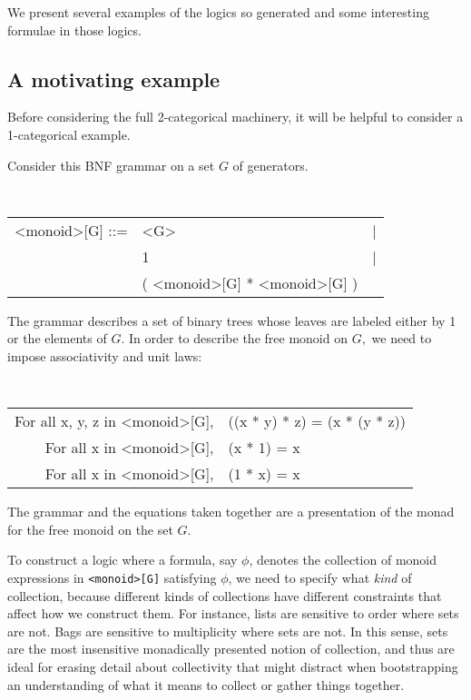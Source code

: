 \documentclass{article}
\begin{document}
We present several examples of the logics so generated and some interesting formulae in those logics.

\subsection{A motivating example}

Before considering the full 2-categorical machinery, it will be helpful to consider a 1-categorical example.

Consider this BNF grammar on a set $G$ of generators.
\begin{center}
  \tt
  \begin{tabular}{rll}
    <monoid>[G] ::= & <G> &|\\
    & 1 &|\\
    & ( <monoid>[G] * <monoid>[G] )
  \end{tabular}
\end{center}
The grammar describes a set of binary trees whose leaves are labeled either by 1 or the elements of $G.$  In order to describe the free monoid on $G,$ we need to impose associativity and unit laws:
\begin{center}
  \tt
  \begin{tabular}{rl}
    For all x, y, z in <monoid>[G], & ((x * y) * z) = (x * (y * z))\\
    For all x in <monoid>[G], & (x * 1) = x\\
    For all x in <monoid>[G], & (1 * x) = x
  \end{tabular}
\end{center}
The grammar and the equations taken together are a presentation of the monad for the free monoid on the set $G$.

To construct a logic where a formula, say $\phi$, denotes the
collection of monoid expressions in {\tt <monoid>[G]} satisfying $\phi$, 
we need to specify what \emph{kind} of collection, because different kinds
of collections have different constraints that affect how we construct them.
For instance, lists are sensitive to order where sets are not. Bags are
sensitive to multiplicity where sets are not. In this sense, sets are
the most insensitive monadically presented notion of collection, and
thus are ideal for erasing detail about collectivity that might
distract when bootstrapping an understanding of what it means to
collect or gather things together.
\end{document}
